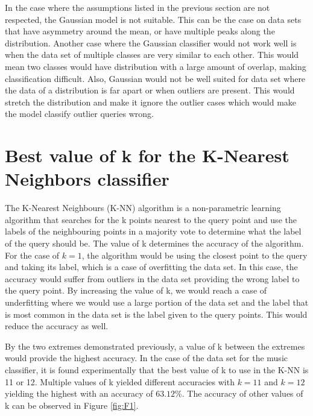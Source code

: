 \documentclass[11pt]{scrartcl}
\begin{document}
In the case where the assumptions listed in the previous section are not respected, the Gaussian model is not suitable. This can be the case on data sets that have asymmetry around the mean, or have multiple peaks along the distribution. Another case where the Gaussian classifier would not work well is when the data set of multiple classes are very similar to each other. This would mean two classes would have distribution with a large amount of overlap, making classification difficult. Also, Gaussian would not be well suited for data set where the data of a distribution is far apart or when outliers are present. This would stretch the distribution and make it ignore the outlier cases which would make the model classify outlier queries wrong.

\section{Best value of k for the K-Nearest Neighbors classifier}

The K-Nearest Neighbours (K-NN) algorithm is a non-parametric learning algorithm that searches for the k points nearest to the query point and use the labels of the neighbouring points in a majority vote to determine what the label of the query should be. The value of k determines the accuracy of the algorithm. For the case of $k=1$, the algorithm would be using the closest point to the query and taking its label, which is a case of overfitting the data set. In this case, the accuracy would suffer from outliers in the data set providing the wrong label to the query point. By increasing the value of k, we would reach a case of underfitting where we would use a large portion of the data set and the label that is most common in the data set is the label given to the query points. This would reduce the accuracy as well.

By the two extremes demonstrated previously, a value of k between the extremes would provide the highest accuracy. In the case of the data set for the music classifier, it is found experimentally that the best value of k to use in the K-NN is 11 or 12. Multiple values of k yielded different accuracies with $k=11$ and $k=12$ yielding the highest with an accuracy of $63.12\%$. The accuracy of other values of k can be observed in Figure \ref{fig:F1}.
\end{document}
